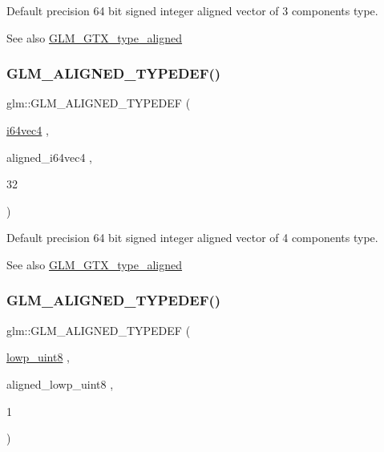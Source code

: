 Default precision 64 bit signed integer aligned vector of 3 components type. \begin{DoxySeeAlso}{See also}
\mbox{\hyperlink{group__gtx__type__aligned}{G\+L\+M\+\_\+\+G\+T\+X\+\_\+type\+\_\+aligned}} 
\end{DoxySeeAlso}
\mbox{\label{group__gtx__type__aligned_ga716f8ea809bdb11b5b542d8b71aeb04f}} 
\subsubsection{\texorpdfstring{GLM\_ALIGNED\_TYPEDEF()}{GLM\_ALIGNED\_TYPEDEF()}\hspace{0.1cm}{\footnotesize\ttfamily [68/209]}}
{\footnotesize\ttfamily glm\+::\+G\+L\+M\+\_\+\+A\+L\+I\+G\+N\+E\+D\+\_\+\+T\+Y\+P\+E\+D\+EF (\begin{DoxyParamCaption}\item[{\mbox{\hyperlink{group__gtc__type__precision_gade5e969a6155752095d2cd603bda9408}{i64vec4}}}]{,  }\item[{aligned\+\_\+i64vec4}]{,  }\item[{32}]{ }\end{DoxyParamCaption})}

Default precision 64 bit signed integer aligned vector of 4 components type. \begin{DoxySeeAlso}{See also}
\mbox{\hyperlink{group__gtx__type__aligned}{G\+L\+M\+\_\+\+G\+T\+X\+\_\+type\+\_\+aligned}} 
\end{DoxySeeAlso}
\mbox{\label{group__gtx__type__aligned_gad46f8e9082d5878b1bc04f9c1471cdaa}} 
\subsubsection{\texorpdfstring{GLM\_ALIGNED\_TYPEDEF()}{GLM\_ALIGNED\_TYPEDEF()}\hspace{0.1cm}{\footnotesize\ttfamily [69/209]}}
{\footnotesize\ttfamily glm\+::\+G\+L\+M\+\_\+\+A\+L\+I\+G\+N\+E\+D\+\_\+\+T\+Y\+P\+E\+D\+EF (\begin{DoxyParamCaption}\item[{\mbox{\hyperlink{group__gtc__type__precision_ga4d9dc08b7b248a386dfe9afd00fc6b1e}{lowp\+\_\+uint8}}}]{,  }\item[{aligned\+\_\+lowp\+\_\+uint8}]{,  }\item[{1}]{ }\end{DoxyParamCaption})}

